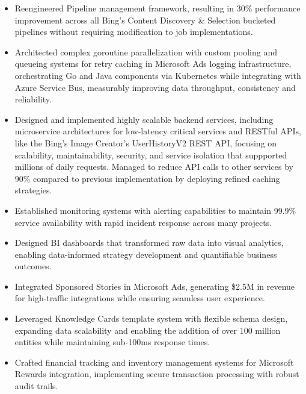 \begin{itemize}
    \item \scriptsize{Reengineered Pipeline management framework, resulting in 30\% performance
        improvement across all Bing's Content Discovery \& Selection bucketed pipelines without
        requiring modification to job implementations.}

    \item \scriptsize{Architected complex goroutine parallelization with custom pooling and queueing
        systems for retry caching in Microsoft Ads logging infrastructure, orchestrating Go and Java
        components via Kubernetes while integrating with Azure Service Bus, measurably improving data
        throughput, consistency and reliability.}
    
    \item \scriptsize{Designed and implemented highly scalable backend services, including
        microservice architectures for low-latency critical services and RESTful APIs, like the Bing's Image Creator's UserHistoryV2 REST API, focusing on scalability, maintainability, security, and service isolation that suppported millions of daily requests. Managed to reduce API calls to other services by 90\% compared to previous implementation by deploying refined caching strategies.}
    
    \item \scriptsize{Established monitoring systems with alerting capabilities to maintain 99.9\%
        service availability with rapid incident response across many projects.}

    \item \scriptsize{Designed BI dashboards that transformed raw data into visual analytics, enabling
        data-informed strategy development and quantifiable business outcomes.}

    \item \scriptsize{Integrated Sponsored Stories in Microsoft Ads, generating \$2.5M in revenue for
        high-traﬀic integrations while ensuring seamless user experience.}

    \item \scriptsize{Leveraged Knowledge Cards template system with flexible schema design, expanding
        data scalability and enabling the addition of over 100 million entities while maintaining
        sub-100ms response times.}

    \item \scriptsize{Crafted financial tracking and inventory management systems for Microsoft Rewards
        integration, implementing secure transaction processing with robust audit trails.}


\end{itemize}

